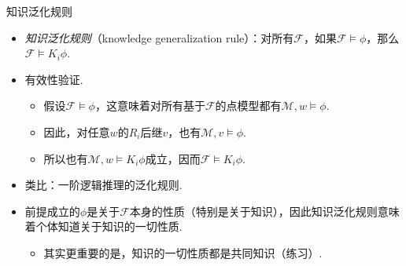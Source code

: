 \begin{frame}{知识泛化规则}
\begin{itemize}
    \item \emph{知识泛化规则}（knowledge generalization rule）：对所有$\mathcal F$，如果$\mathcal F\vDash\phi$，那么$\mathcal F\vDash K_i\phi$.
    \item 有效性验证.
    \begin{itemize}
        \item 假设$\mathcal F\vDash\phi$，这意味着对所有基于$\mathcal F$的点模型都有$\mathcal M,w\vDash\phi$.
        \item 因此，对任意$w$的$R_i$后继$v$，也有$\mathcal M,v\vDash\phi$.
        \item 所以也有$\mathcal M,w\vDash K_i\phi$成立，因而$\mathcal F\vDash K_i\phi$.
    \end{itemize}
    \item 类比：一阶逻辑推理的泛化规则.
    \item 前提成立的$\phi$是关于$\mathcal F$本身的性质（特别是关于知识），因此知识泛化规则意味着个体知道关于知识的一切性质.
    \begin{itemize}
        \item 其实更重要的是，知识的一切性质都是共同知识（练习）.%
    \end{itemize}
\end{itemize}
\end{frame}

